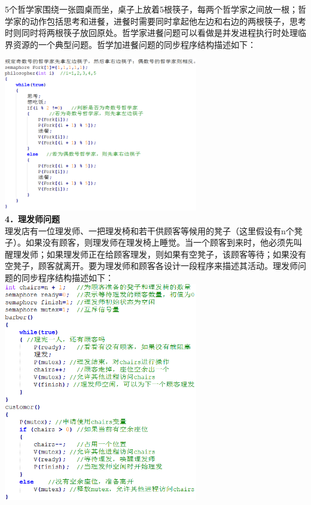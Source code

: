 5个哲学家围绕一张圆桌而坐，桌子上放着5根筷子，每两个哲学家之间放一根；哲学家的动作包括思考和进餐，进餐时需要同时拿起他左边和右边的两根筷子，思考时则同时将两根筷子放回原处。哲学家进餐问题可以看做是并发进程执行时处理临界资源的一个典型问题。哲学加进餐问题的同步程序结构描述如下：

\includegraphics[width=3.33333in,height=2.63542in]{png-jpeg-pics/FB3C7B1684379C75AE7C6A1E15CA2C42.png}\\
\textbf{{4．理发师问题}}\\
理发店有一位理发师、一把理发椅和若干供顾客等候用的凳子（这里假设有n个凳子）。如果没有顾客，则理发师在理发椅上睡觉。当一个顾客到来时，他必须先叫醒理发师；如果理发师正在给顾客理发，则如果有空凳子，该顾客等待；如果没有空凳子，顾客就离开。要为理发师和顾客各设计一段程序来描述其活动。理发师{问题的同步程序结构描述如下：}\\

\includegraphics[width=3.33333in,height=3.76042in]{png-jpeg-pics/DF23E2EB33D39390BDB5AD2840A4BD2C.png}\\
